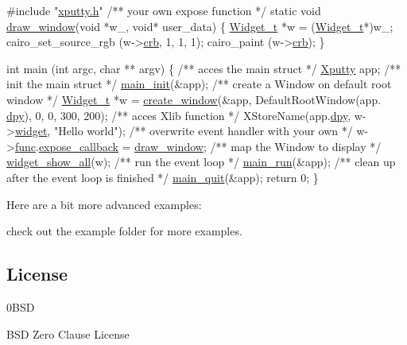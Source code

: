 \begin{DoxyCode}
\textcolor{preprocessor}{#include "\hyperlink{xputty_8h}{xputty.h}"}
\textcolor{comment}{}
\textcolor{comment}{/** your own expose function */}
\textcolor{keyword}{static} \textcolor{keywordtype}{void} \hyperlink{xfile-dialog_8c_ab1219e8c5af9084d5c2846d6d5b31f09}{draw\_window}(\textcolor{keywordtype}{void} *w\_, \textcolor{keywordtype}{void}* user\_data) \{
    \hyperlink{structWidget__t}{Widget\_t} *w = (\hyperlink{structWidget__t}{Widget\_t}*)w\_;
    cairo\_set\_source\_rgb (w->\hyperlink{structWidget__t_ad98022ee160d4c0906110868fc9e5664}{crb}, 1, 1, 1);
    cairo\_paint (w->\hyperlink{structWidget__t_ad98022ee160d4c0906110868fc9e5664}{crb});
\}

\textcolor{keywordtype}{int} main (\textcolor{keywordtype}{int} argc, \textcolor{keywordtype}{char} ** argv)
\{\textcolor{comment}{}
\textcolor{comment}{    /** acces the main struct */}
    \hyperlink{structXputty}{Xputty} app;\textcolor{comment}{}
\textcolor{comment}{    /** init the main struct */}
    \hyperlink{xputty_8c_a484645d624d9e9eff0288f8d5583ff5e}{main\_init}(&app);\textcolor{comment}{}
\textcolor{comment}{    /** create a Window on default root window */}
    \hyperlink{structWidget__t}{Widget\_t} *w = \hyperlink{xwidget_8c_a5528f841e6b5f2ef62b3b10bfa8bf20f}{create\_window}(&app, DefaultRootWindow(app.
      \hyperlink{structXputty_ab185ae4fd00ee1930c61e0440734878f}{dpy}), 0, 0, 300, 200);\textcolor{comment}{}
\textcolor{comment}{    /** acces Xlib function */}
    XStoreName(app.\hyperlink{structXputty_ab185ae4fd00ee1930c61e0440734878f}{dpy}, w->\hyperlink{structWidget__t_acb2bfb41674371ee1220a9d6a2d89fb1}{widget}, \textcolor{stringliteral}{"Hello world"});\textcolor{comment}{}
\textcolor{comment}{    /** overwrite event handler with your own */}
    w->\hyperlink{structWidget__t_a225b9a175e132994a5aa73b59a2911ad}{func}.\hyperlink{structFunc__t_ae4ba307ec29bfea83e1197aa750c1396}{expose\_callback} = \hyperlink{xfile-dialog_8c_ab1219e8c5af9084d5c2846d6d5b31f09}{draw\_window};\textcolor{comment}{}
\textcolor{comment}{    /** map the Window to display */}
    \hyperlink{xwidget_8c_aae228a75c93bb0cb9ad57ffaf4d25922}{widget\_show\_all}(w);\textcolor{comment}{}
\textcolor{comment}{    /** run the event loop */}
    \hyperlink{xputty_8c_abb548ea64f852a7c94473a595e67d69f}{main\_run}(&app);\textcolor{comment}{}
\textcolor{comment}{    /** clean up after the event loop is finished */}
    \hyperlink{xputty_8c_a0d4eda902b4de6f7a30e8d869f842fda}{main\_quit}(&app);
    \textcolor{keywordflow}{return} 0;
\}
\end{DoxyCode}


Here are a bit more advanced examples\+:





check out the example folder for more examples.

\subsection*{License}

\begin{DoxyVerb}     0BSD 
\end{DoxyVerb}
 B\+SD Zero Clause License 